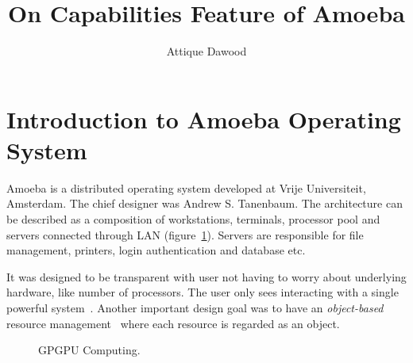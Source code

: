 \documentclass[11pt,a4paper]{article}
\begin{document}
\title{On Capabilities Feature of Amoeba}
\author{Attique Dawood}
\maketitle

\section{Introduction to Amoeba Operating System}

Amoeba is a distributed operating system developed at Vrije Universiteit, Amsterdam. The chief designer was Andrew S. Tanenbaum. The architecture can be described as a composition of workstations, terminals, processor pool and servers connected through LAN (figure~\ref{amoeba-architecture}). Servers are responsible for file management, printers, login authentication and database etc.

It was designed to be transparent with user not having to worry about underlying hardware, like number of processors. The user only sees interacting with a single powerful system~\cite{amoeba-sourceforge}. Another important design goal was to have an \emph{object-based} resource management~\cite{distributed-systems-book} where each resource is regarded as an object.

\begin{figure}[here]
\centering
{}
\end{figure}

\begin{figure}[here]
\centering
{}
\caption{GPGPU Computing.}
\label{amoeba-architecture}
\end{figure}
\end{document}

